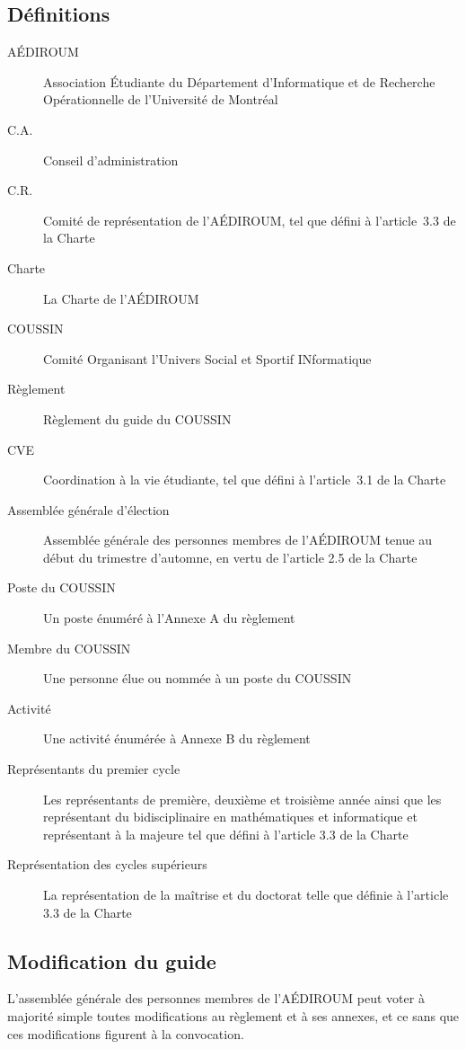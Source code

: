 \documentclass{aediroum}
\begin{document}
\subsection{Définitions}
\begin{description}
    \item[AÉDIROUM] Association Étudiante du Département d'Informatique et de Recherche Opérationnelle de l'Université de Montréal
    \item[C.A.] Conseil d’administration
    \item[C.R.] Comité de représentation de l'AÉDIROUM, tel que défini à l'article~3.3 de la Charte
    \item[Charte] La Charte de l'AÉDIROUM
    \item[COUSSIN] Comité Organisant l'Univers Social et Sportif INformatique
    \item[Règlement] Règlement du guide du COUSSIN
    \item[CVE] Coordination à la vie étudiante, tel que défini à l'article~3.1 de la Charte
    \item[Assemblée générale d'élection] Assemblée générale des personnes membres de l'AÉDIROUM tenue au début du trimestre d'automne, en vertu de l'article 2.5 de la Charte
    \item[Poste du COUSSIN] Un poste énuméré à l'Annexe A du règlement
    \item[Membre du COUSSIN] Une personne élue ou nommée à un poste du COUSSIN
    \item[Activité] Une activité énumérée à Annexe B du règlement
    \item[Représentants du premier cycle] Les représentants de première, deuxième et troisième année ainsi que les représentant du bidisciplinaire en mathématiques et informatique et représentant à la majeure tel que défini à l'article 3.3 de la Charte
    \item[Représentation des cycles supérieurs] La représentation de la maîtrise et du doctorat telle que définie à l'article 3.3 de la Charte
\end{description}

\subsection{Modification du guide}
L'assemblée générale des personnes membres de l'AÉDIROUM peut voter à majorité simple toutes modifications au règlement et à ses annexes, et ce sans que ces modifications figurent à la convocation.
\end{document}
